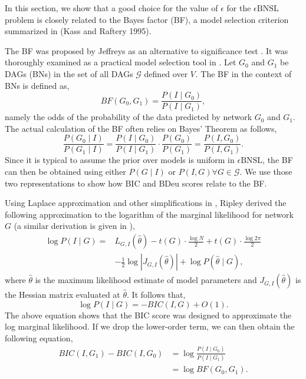 \documentclass[letterpaper]{article}
\newcommand{\graph}{\mathit{G}}
\newcommand{\graphset}{\mathcal{G}}
\newcommand{\vertex}[1]{V_{#1}}
\newcommand{\problem}{\mathit{\epsilon}\text{BNSL}}
\newcommand{\varI}{I}
\begin{document}
In this section, we show that a good choice for the value of $\epsilon$ for the
$\problem$ problem is closely related to the 
Bayes factor (BF), a model selection criterion summarized in (Kass and Raftery 1995).

The BF was proposed by Jeffreys as an alternative to significance test \cite{jeffreys1967theory}. It was thoroughly examined as a practical model selection tool in \cite{kass1995bayes}. Let $\graph_0$ and $\graph_1$ be DAGs (BNs) in the set of all DAGs $\graphset$ defined over $\vertex{}$. The BF in the context of BNs is defined as,
$$
BF(\graph_0,\graph_1)=\frac{P(\varI \mid \graph_0)}{P(\varI \mid \graph_1)},
$$
namely the odds of the probability of the data predicted by network $\graph_0$ and $\graph_1$. The actual calculation of the BF often relies on  Bayes' Theorem as follows,
$$
\frac{P(\graph_0 \mid \varI)}{P(\graph_1 \mid \varI)}=\frac{P(\varI \mid \graph_0)}{P(\varI \mid \graph_1)}\cdot\frac{P(\graph_0)}{P(\graph_1)}=\frac{P(\varI,\graph_0)}{P(\varI,\graph_1)}.
$$
Since it is typical to assume the prior over models is uniform in $\problem$, the BF can then be obtained using either $P(\graph \mid \varI)$ or $P(\varI,\graph)\forall\graph\in\graphset$. We use those two representations to show how BIC and BDeu scores relate to the BF.

Using Laplace approximation and other simplifications in \cite{ripley1996pattern}, Ripley derived the following approximation to the logarithm of the marginal likelihood for network $\graph$ (a similar derivation is given in \cite{Claeskens2008}),
\begin{align*}
\log{P(\varI \mid \graph)} =& L_{G,I} (\hat{\theta}) - t({G})\cdot \frac{\log N}{2}+t({G}) \cdot \frac{\log{2\pi}}{2}\\
&-\frac{1}{2}\log{|J_{G,I} (\hat{\theta})|} + \log{P(\hat{\theta} \mid \graph)},
\end{align*}
where $\hat{\theta}$ is the maximum likelihood estimate of model parameters and $J_{G,I} (\hat{\theta})$ is the Hessian matrix evaluated at $\hat{\theta}$. It follows that,
$$
\log{P(\varI \mid \graph)}=-BIC(\varI,\graph)+O(1).
$$
The above equation shows that the BIC score was designed to approximate the log marginal likelihood. 
If we drop the lower-order term, we can then obtain the following equation,
\begin{align*}
    BIC(\varI,\graph_1)-BIC(\varI,\graph_0)&=\log{\frac{P(\varI \mid \graph_0)}{P(\varI \mid \graph_1)}}\\
    &=\log{BF(\graph_0,\graph_1)}.
\end{align*}
\end{document}

